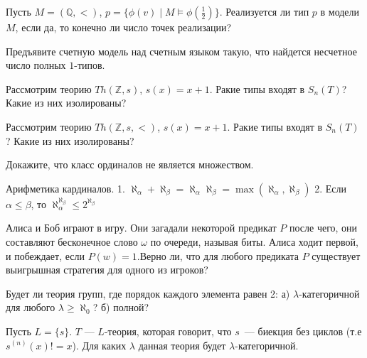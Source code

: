 \setcounter{curtask}{14}


\begin{task}
    Пусть $M = (\mathbb{Q}, <)$,
    $p = \{\phi(v) \mid M \models \phi(\frac{1}{2})\}$.
    Реализуется ли тип $p$ в модели $M$, если да, то конечно ли число точек
    реализации? 
\end{task}

\begin{task}
    Предъявите счетную модель над счетным языком такую, что найдется несчетное число
    полных $1$-типов.
\end{task}

\begin{task}
    Рассмотрим теорию $Th(\mathbb{Z}, s)$, $s(x) = x + 1$. Ракие типы входят в
    $S_n(T)$? Какие из них изолированы?
\end{task}

\begin{task}
    Рассмотрим теорию $Th(\mathbb{Z}, s, <)$, $s(x) = x + 1$. Ракие типы входят в
    $S_n(T)$? Какие из них изолированы?
\end{task}


\breakline

\begin{task}{8}
    Докажите, что класс ординалов не является множеством.
\end{task}

\begin{task}{9}
    Арифметика кардиналов.
    1. $\aleph_{\alpha} + \aleph_{\beta} = \aleph_{\alpha}  \aleph_{\beta} =
    	\max(\aleph_{\alpha}, \aleph_{\beta})$
    2. Если $\alpha \le \beta$, то $\aleph_{\alpha}^{\aleph_{\beta}} \le 2^{\aleph_{\beta}}$
\end{task}

\begin{task}{11}
    Алиса и Боб играют в игру. Они загадали некоторой предикат $P$ после чего, они
    составляют бесконечное слово $\omega$ по очереди, называя биты. Алиса ходит
    первой, и побеждает, если $P(w) = 1$.Верно ли, что для любого предиката $P$
    существует выигрышная стратегия для одного из игроков?
\end{task}

\begin{task}{12}
    Будет ли теория групп, где порядок каждого элемента равен 2:
    а) $\lambda$-категоричной для любого $\lambda \ge \aleph_0$?
    б) полной?
\end{task}

\begin{task}{13}
    Пусть $L = \{s\}$. $T$ --- $L$-теория, которая говорит, что $s$~--- биекция без
	циклов (т.е $s^{(n)}(x) != x$). Для каких $\lambda$ данная теория будет
    $\lambda$-категоричной.
\end{task}